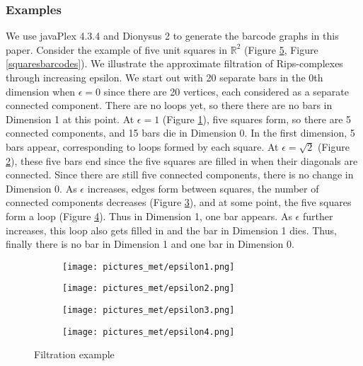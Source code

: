 \documentclass[12pt]{article}
\theoremstyle{definition}
\begin{document}
\subsubsection{Examples}

We use javaPlex 4.3.4\cite{Javaplex} and Dionysus 2 \cite{Dionysus} to generate the barcode graphs in this paper. Consider the example of five unit squares in $\mathbb{R}^2$ (Figure \ref{five_squares_paint}, Figure \ref{squaresbarcodes}). We illustrate the approximate filtration of Rips-complexes through increasing epsilon. We start out with 20 separate bars in the 0th dimension when $\epsilon = 0$ since there are 20 vertices, each considered as a separate connected component. There are no loops yet, so there there are no bars in Dimension 1 at this point. At $\epsilon = 1$ (Figure \ref{eps1}),  five squares form, so there are 5 connected components, and 15 bars die in Dimension 0. In the first dimension, 5 bars appear, corresponding to loops formed by each square. At $\epsilon = \sqrt{2}$ (Figure \ref{eps2}), these five bars end since the five squares are filled in when their diagonals are connected. Since there are still five connected components, there is no change in Dimension 0. As $\epsilon$ increases, edges form between squares, the number of connected components decreases (Figure \ref{eps3}), and at some point, the five squares form a loop (Figure \ref{eps4}). Thus in Dimension 1, one bar appears. As $\epsilon$ further increases, this loop also gets filled in and the bar in Dimension 1 dies. Thus, finally there is no bar in Dimension 1 and one bar in Dimension 0. 
\begin{figure}[H]
\centering
\begin{subfigure}{.5\textwidth}
  \centering
  \texttt{[image: pictures\_met/epsilon1.png]} 
  \caption{}
  \label{eps1} 
\end{subfigure}%
\begin{subfigure}{.5\textwidth}
  \centering  \texttt{[image: pictures\_met/epsilon2.png]} 
  \caption{}
  \label{eps2}
\end{subfigure}
\begin{subfigure}{.5\textwidth}
  \centering
  \texttt{[image: pictures\_met/epsilon3.png]} 
  \caption{}
  \label{eps3} 
\end{subfigure}%
\begin{subfigure}{.5\textwidth}
  \centering
  \texttt{[image: pictures\_met/epsilon4.png]} 
  \caption{}
  \label{eps4}
\end{subfigure}
\caption{Filtration example}
\label{five_squares_paint}
\end{figure}
\end{document}
